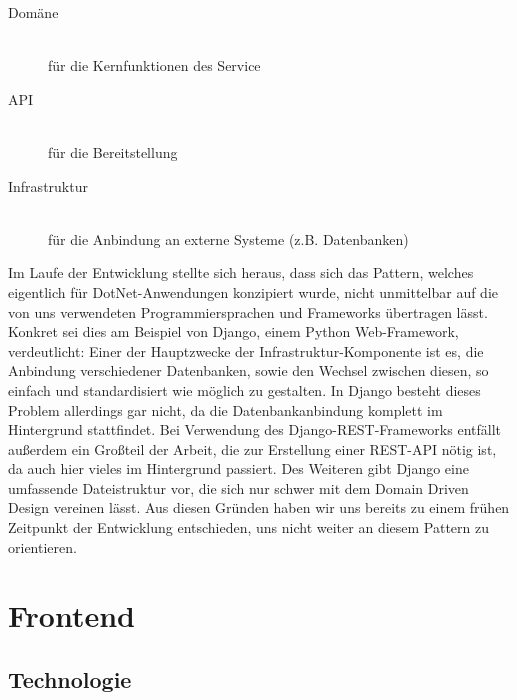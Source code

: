\documentclass{article}
\begin{document}
\begin{description}
	\item[Domäne]
	\hfill \\
	für die Kernfunktionen des Service
	\item[API]
	\hfill \\
	für die Bereitstellung
	\item[Infrastruktur]
	\hfill \\
	für die Anbindung an externe Systeme (z.B. Datenbanken)
\end{description}
Im Laufe der Entwicklung stellte sich heraus, dass sich das Pattern, welches eigentlich für DotNet-Anwendungen konzipiert wurde, nicht unmittelbar auf die von uns verwendeten Programmiersprachen und Frameworks übertragen lässt. Konkret sei dies am Beispiel von Django, einem Python Web-Framework, verdeutlicht: Einer der Hauptzwecke der Infrastruktur-Komponente ist es, die Anbindung verschiedener Datenbanken, sowie den Wechsel zwischen diesen, so einfach und standardisiert wie möglich zu gestalten. In Django besteht dieses Problem allerdings gar nicht, da die Datenbankanbindung komplett im Hintergrund stattfindet. Bei Verwendung des Django-REST-Frameworks entfällt außerdem ein Großteil der Arbeit, die zur Erstellung einer REST-API nötig ist, da auch hier vieles im Hintergrund passiert. Des Weiteren gibt Django eine umfassende Dateistruktur vor, die sich nur schwer mit dem Domain Driven Design vereinen lässt. Aus diesen Gründen haben wir uns bereits zu einem frühen Zeitpunkt der Entwicklung entschieden, uns nicht weiter an diesem Pattern zu orientieren.


\section{Frontend} %


\subsection{Technologie}
\label{sec:frontend-tech}
\end{document}
